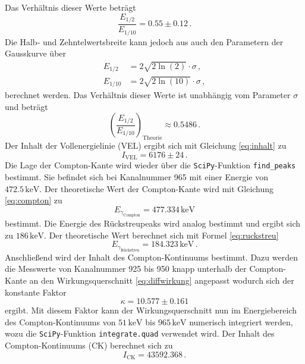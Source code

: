 Das Verhältnis dieser Werte beträgt
\begin{equation}
    \frac{E_{1/2}}{E_{1/10}} = 0.55 \pm 0.12 \, .
\end{equation}
Die Halb- und Zehntelwertsbreite kann jedoch aus auch den Parametern der Gausskurve über 
\begin{align}
    E_{1/2}  &= 2 \sqrt{2 \ln (2)} \cdot \sigma \, , \\
    E_{1/10} &= 2 \sqrt{2 \ln (10)} \cdot \sigma \, ,
\end{align}
berechnet werden. Das Verhältnis dieser Werte ist unabhängig vom Parameter $\sigma$
und beträgt
\begin{equation}
    \left(\frac{E_{1/2}}{E_{1/10}}\right)_\text{Theorie} \approx 0.5486 \, .
\end{equation}
Der Inhalt der Vollenergielinie (VEL) ergibt sich mit Gleichung \eqref{eq:inhalt} zu
\begin{equation}
    I_\text{VEL} = 6176 \pm 24 \, .
\end{equation}
Die Lage der Compton-Kante wird wieder über die \texttt{SciPy}-Funktion \texttt{find\_peaks} bestimmt. 
Sie befindet sich bei Kanalnummer 965 mit einer Energie von $472.5 \, \text{keV}$.
Der theoretische Wert der Compton-Kante wird mit Gleichung \eqref{eq:compton} zu
\begin{equation}
    E_{\gamma_\text{Compton}} = 477.334 \, \text{keV} 
\end{equation}
bestimmt.
Die Energie des Rückstreupeaks wird analog bestimmt und ergibt sich zu $186 \, \text{keV}$.
Der theoretische Wert berechnet sich mit Formel \eqref{eq:ruckstreu}
\begin{equation}
    E_{\gamma_\text{Rückstreu}} = 184.323 \, \text{keV} \, .
\end{equation}
Anschließend wird der Inhalt des Compton-Kontinuums bestimmt.
Dazu werden die Messwerte von Kanalnummer 925 bis 950 knapp unterhalb der Compton-Kante 
an den Wirkungsquerschnitt \eqref{eq:diffwirkung} angepasst wodurch sich der konstante Faktor
\begin{equation}
    \kappa = 10.577 ± 0.161
\end{equation}
ergibt. Mit diesem Faktor kann der Wirkungsquerschnitt nun im Energiebereich des Compton-Kontinuums
von $51\, \text{keV}$ bis $965 \, \text{keV}$ 
numerisch integriert werden, wozu die \texttt{SciPy}-Funktion \texttt{integrate.quad} verwendet wird.
Der Inhalt des Compton-Kontinuums (CK) berechnet sich zu 
\begin{equation}
    I_\text{CK}  = 43592.368 \, .
\end{equation}
